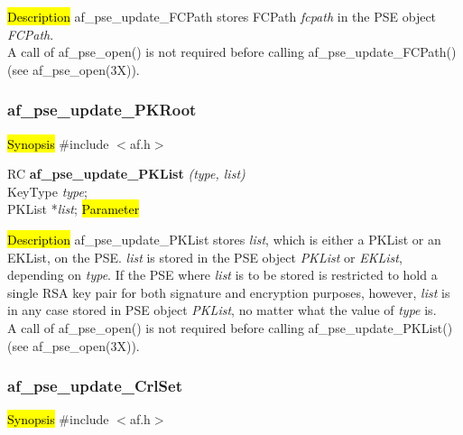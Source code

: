 \hl{Description}
af\_pse\_update\_FCPath stores FCPath {\em fcpath} in the PSE object
{\em FCPath}.
\\ [1em]
A call of af\_pse\_open() is not required before calling af\_pse\_update\_FCPath()
(see af\_pse\_open(3X)).

\subsubsection{af\_pse\_update\_PKRoot}
\label{af_update_PKList}
\hl{Synopsis}
\#include $<$af.h$>$

RC {\bf af\_pse\_update\_PKList} {\em (type, list)} \\
KeyType {\em type}; \\
PKList *{\em list};
\hl{Parameter}


\hl{Description}
af\_pse\_update\_PKList stores {\em list}, which is either a PKList or an EKList, 
on the PSE. {\em list} is stored in the PSE object {\em PKList} or {\em EKList}, depending
on {\em type}.
If the PSE where {\em list} is to be stored is restricted to hold a single RSA key pair
for both signature and encryption purposes, however, {\em list} is in any case stored in PSE object {\em PKList}, no
matter what the value of {\em type} is.
\\ [1em]
A call of af\_pse\_open() is not required before calling af\_pse\_update\_PKList()
(see af\_pse\_open(3X)).

\subsubsection{af\_pse\_update\_CrlSet}
\label{af_update_PKRoot}

\hl{Synopsis}
\#include $<$af.h$>$ 


